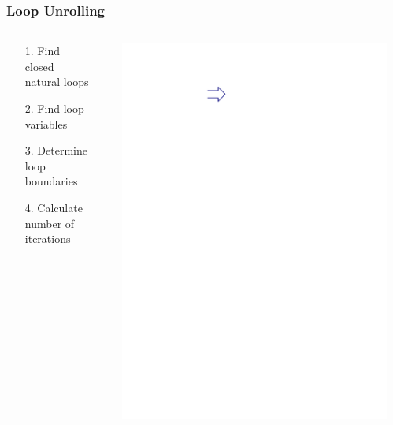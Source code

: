 \documentclass[navbaroff,en]{sdqbeamer}
\begin{document}
\begin{frame}
    \frametitle{Loop Unrolling}

	\begin{columns}
		\begin{column}{0.48\textwidth}
			\begin{itemize}
				\item[1.] Find closed natural loops
				\item[2.] Find loop variables
				\item[3.] Determine loop boundaries
				\item[4.] Calculate number of iterations
			\end{itemize}
		\end{column}
		\begin{column}{0.25\textwidth}
			\centering
			\scalebox{0.2}{%
				
			}
		\end{column}
		\begin{column}{0.09\textwidth}
					\centering
					\includegraphics[scale=0.7]{images/arrow.ipe.pdf}
		\end{column}
		\begin{column}{0.16\textwidth}
			\centering
			\scalebox{0.13}{%
				
			}
		\end{column}
	\end{columns}
\end{frame}
\end{document}
